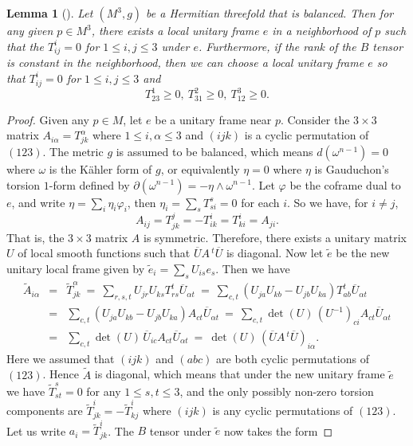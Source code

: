 \documentclass{amsart}
\numberwithin{equation}{section}
\newtheorem{lemma}  [theorem]     {Lemma}
\theoremstyle{definition}
\renewcommand{\1}{\mathds{1}}
\renewcommand{\>}{\rightarrow}
\begin{document}
\begin{lemma}[\cite{ZhouZ}] \label{lemmaA}
Let $(M^3,g)$ be a Hermitian threefold that is balanced. Then for any given $p\in M^3$, there exists a local unitary frame $e$ in a neighborhood of $p$ such that the $T^i_{ij}=0$ for $1\leq i,j\leq 3$ under $e$. Furthermore, if the rank of the $B$ tensor is constant in the neighborhood, then we can choose a local unitary frame $e$ so that $T^i_{ij}=0$ for $1\leq i,j\leq 3$ and
$$T^1_{23} \geq 0,\ T^2_{31} \geq 0,\ T^3_{12} \geq 0. $$
\end{lemma}

\begin{proof}
Given any $p\in M$, let $e$ be a unitary frame near $p$. Consider the $3\times 3$ matrix $A_{i\alpha} =T^{\alpha }_{jk}$ where $1\leq i,\alpha \leq 3$ and $(ijk)$ is a cyclic permutation of $(123)$. The metric $g$ is assumed to be balanced, which means $d(\omega^{n-1})=0$ where $\omega$ is the K\"ahler form of $g$, or  equivalently $\eta=0$ where $\eta$ is Gauduchon's torsion $1$-form defined by $\partial (\omega^{n-1}) = -\eta \wedge \omega^{n-1}$. Let $\varphi$ be the coframe dual to $e$, and write $\eta = \sum_i \eta_i \varphi_i$, then  $\eta_i=\sum_s T^s_{si}=0$ for each $i$. So we have, for $i \neq j$,
$$ A_{ij}=T^j_{jk}= - T^i_{ik} = T^i_{ki} = A_{ji}.$$
That is, the  $3\times 3$ matrix $A$ is symmetric. Therefore, there exists a unitary matrix $U$ of local smooth functions such that $\overline{U} A \,^t\!\overline{U}$ is diagonal. Now let $\tilde{e}$ be the new unitary local frame given by $\tilde{e}_i = \sum_s U_{is}e_s$. Then we have
\begin{eqnarray*}
 \widetilde{A}_{i\alpha} & = &  \widetilde{T}^{\alpha}_{jk} \ = \ \sum_{r,s,t} U_{jr}U_{ks} T^t_{rs} \overline{U}_{\alpha t} \ = \ \sum_{c,t} (U_{ja}U_{kb}-U_{jb}U_{ka}) T^t_{ab} \overline{U}_{\alpha t} \\
 & = & \sum_{c,t} (U_{ja}U_{kb}-U_{jb}U_{ka}) A_{ct} \overline{U}_{\alpha t} \ = \  \sum_{c,t} \det (U) \,(U^{-1})_{ci} A_{ct} \overline{U}_{\alpha t}   \\
 & = & \sum_{c,t} \det (U)\, \overline{U}_{ic}A_{ct} \overline{U}_{\alpha t} \ = \ \det (U)\, (\overline{U} A \,^t\!\overline{U})_{i\alpha}.
 \end{eqnarray*}
Here we assumed that $(ijk)$ and $(abc)$ are both cyclic permutations of $(123)$. Hence $\widetilde{A}$ is diagonal, which means that under the new unitary frame $\tilde{e}$ we have $\widetilde{T}^s_{st}=0$ for any $1\leq s,t\leq 3$, and the only possibly non-zero torsion components are $\widetilde{T}^i_{jk}=-\widetilde{T}^i_{kj}$ where $(ijk)$ is any cyclic permutations of $(123)$. Let us write $a_i=\widetilde{T}^i_{jk}$. The $B$ tensor under $\tilde{e}$ now takes the form

\end{proof}
\end{document}
